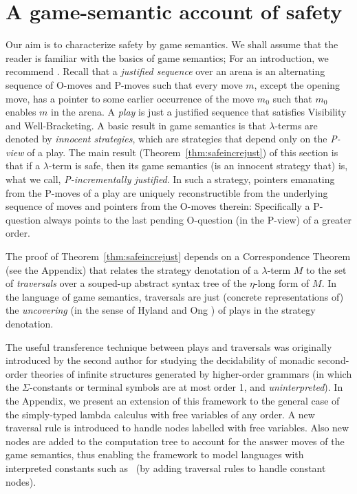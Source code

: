 
\section{A game-semantic account of safety}
\label{sec:gamesemaccount} Our aim is to characterize safety by game
semantics. We shall assume that the reader is familiar with the
basics of game semantics; For an introduction, we recommend
\cite{abramsky:game-semantics-tutorial}. Recall that a
\emph{justified sequence} over an arena is an alternating sequence
of O-moves and P-moves such that every move $m$, except the opening
move, has a pointer to some earlier occurrence of the move $m_0$
such that $m_0$ enables $m$ in the arena. A \emph{play} is just a
justified sequence that satisfies Visibility and Well-Bracketing. A
basic result in game semantics is that $\lambda$-terms are denoted
by \emph{innocent strategies}, which are strategies that depend only
on the \emph{P-view} of a play. The main result
(Theorem~\ref{thm:safeincrejust}) of this section is that if a
$\lambda$-term is safe, then its game semantics (is an innocent
strategy that) is, what we call, \emph{P-incrementally justified}. In such a
strategy, pointers emanating from the P-moves of a play are uniquely
reconstructible from the underlying sequence of moves and pointers
from the O-moves therein: Specifically a P-question always points to
the last pending O-question (in the P-view) of a greater order.

The proof of Theorem~\ref{thm:safeincrejust} depends on a
Correspondence Theorem (see the Appendix) that relates the strategy
denotation of a $\lambda$-term $M$ to the set of \emph{traversals}
over a souped-up abstract syntax tree of the $\eta$-long form of $M$.
In the language of game semantics, traversals are just (concrete
representations of) the \emph{uncovering} (in the sense of Hyland
and Ong \cite{hylandong_pcf}) of plays in the strategy denotation.

The useful transference technique between plays and traversals was
originally introduced by the second author \cite{OngLics2006} for studying
the decidability of monadic second-order theories of infinite structures generated by
higher-order grammars (in which the $\Sigma$-constants or terminal symbols are at most
order 1, and \emph{uninterpreted}).
In the Appendix, we present an extension of this framework to the
general case of the simply-typed lambda calculus with free variables
of any order. A new traversal rule is introduced to handle nodes
labelled with free variables. Also new nodes are added to the
computation tree to account for the answer moves of the game
semantics, thus enabling the framework to model languages with
interpreted constants such as \pcf~(by adding traversal rules to
handle constant nodes).

